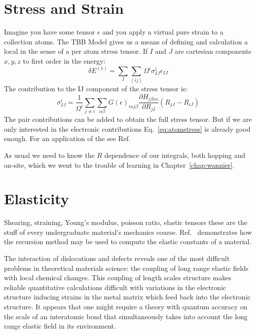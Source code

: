 \section{Stress and Strain}
Imagine you have some tensor $\epsilon$ and you apply a virtual pure strain to a collection atoms.
The TBB Model \cite{sutton88} gives us a means of defining and calculation a local in the sense of a 
per atom stress tensor. 
If $I$ and $J$ are cartesian components $x,y,z$ to first order in the energy:
%
\begin{equation}
\delta E^(1) = \sum_{I} \sum_{(ij)}\Omega^{i}\sigma^{i}_{IJ}\epsilon_{IJ}
\end{equation}
%
The contribution to the IJ component of the stress tensor is:
%
\begin{equation}
\label{eq:atomstress}
\sigma^{i}_{IJ} = \frac{1}{\Omega^{i}}\sum_{j\neq i}\sum_{\alpha\beta}G(\epsilon)_{i\alpha j\beta}\frac{\partial H_{j\beta i\alpha}}{\partial R_{jI}}(R_{jJ}-R_{iJ})
\end{equation}
%
The pair contributions can be added to obtain the full stress tensor. But if we are only interested in the electronic contributions
Eq.~\ref{eq:atomstress} is already good enough. For an application of the see Ref.~\cite{ohta90}

As usual we need to know the $R$ dependence of our
integrals, both hopping and on-site, which we went to the trouble 
of learning in Chapter~\ref{chap:wannier}.

\section{Elasticity}
Shearing, straining, Young's modulus, poisson ratio, elastic tensors these are the
stuff of every undergraduate material's mechanics course.
Ref.~\cite{terakura84} demonstrates how the recursion method
may be used to compute the elastic constants of a material.

The interaction of dislocations and defects reveals one of the most difficult problems
in theoretical materials science: the coupling of long range elastic fields
with local chemical changes. This coupling of length scales structure makes
reliable quantitative calculations difficult with variations in the electronic structure
inducing strains in the metal matrix which feed back into the electronic structure. 
It appears that one might require a theory with quantum accuracy on the scale of an 
interatomic bond that simultaneously takes into account the long range elastic 
field in its environment.


